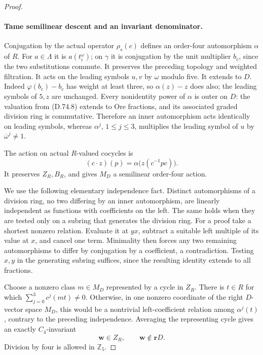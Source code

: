 \begin{proof}
\paragraph{Tame semilinear descent and an invariant denominator.}
Conjugation by the actual operator \(\rho_s(c)\)
defines an order-four automorphism \(\alpha\) of \(R\).
For \(a\in\Lambda\) it is \(a(t_i^\omega)\);
on \(\gamma\) it is conjugation by the unit
multiplier \(b_c\), since the two substitutions commute.
It preserves the preceding topology and weighted
filtration. It acts on the leading symbols \(u,v\)
by \(\omega\) modulo five. It extends to \(D\).
Indeed \(\varphi(b_c)-b_c\) has weight at least
three, so \(\alpha(z)-z\) does also; the leading
symbols of \(5,z\) are unchanged.
Every nonidentity power of \(\alpha\) is outer on
\(D\): the valuation from (D.74.8) extends to Ore
fractions, and its associated graded division ring
is commutative. Therefore an inner automorphism acts
identically on leading symbols, whereas
\(\alpha^j\), \(1\le j\le3\), multiplies the leading
symbol of \(u\) by \(\overline\omega^j\ne1\).

The action on actual \(R\)-valued cocycles is
\[
          (c\cdot z)(p)=\alpha\bigl(z(c^{-1}pc)\bigr).
                                                        \tag{D.74.11}
\]
It preserves \(Z_R,B_R\), and gives \(M_D\) a
semilinear order-four action.

We use the following elementary independence fact.
Distinct automorphisms of a division ring, no two
differing by an inner automorphism, are linearly
independent as functions with coefficients on the
left. The same holds when they are tested only on
a subring that generates the division ring.
For a proof take a shortest nonzero relation.
Evaluate it at \(yx\), subtract a suitable left
multiple of its value at \(x\), and cancel one
term. Minimality then forces any two remaining
automorphisms to differ by conjugation by a
coefficient, a contradiction. Testing \(x,y\) in
the generating subring suffices, since the resulting
identity extends to all fractions.

Choose a nonzero class \(m\in M_D\) represented by
a cycle in \(Z_R\). There is \(t\in R\) for which
\(\sum_{j=0}^3c^j(m t)\ne0\). Otherwise, in one
nonzero coordinate of the right \(D\)-vector space
\(M_D\), this would be a nontrivial left-coefficient
relation among \(\alpha^j(t)\), contrary to the
preceding independence. Averaging the representing
cycle gives an exactly \(C_4\)-invariant
\[
                 \mathbf w\in Z_R,\qquad
                    \mathbf w\notin\mathbf r D.       \tag{D.74.12}
\]
Division by four is allowed in \(\mathbb Z_5\).


\end{proof}
